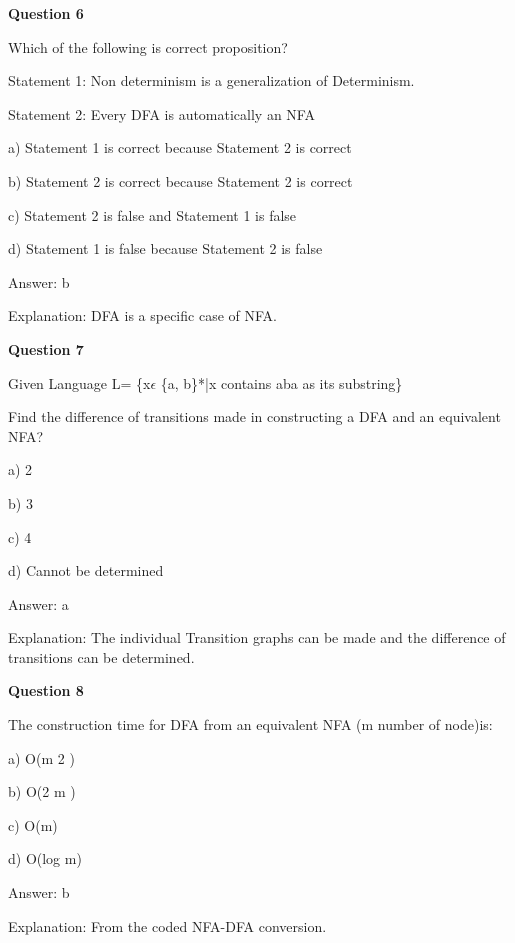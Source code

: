 \documentclass{article}
\begin{document}
\begin{mdframed}[linewidth=1pt, roundcorner=5pt, linecolor=gray!30, backgroundcolor=gray!5]
\textbf{Question 6} 

Which of the following is correct proposition?

Statement 1: Non determinism is a generalization of Determinism.

Statement 2: Every DFA is automatically an NFA

a) Statement 1 is correct because Statement 2 is correct

b) Statement 2 is correct because Statement 2 is correct

c) Statement 2 is false and Statement 1 is false

d) Statement 1 is false because Statement 2 is false
\vspace{5pt} \par
\begin{tcolorbox}[colback=green!5, colframe=green!40!black, title=Solution]
Answer: b

Explanation: DFA is a specific case of NFA.
\end{tcolorbox}
\end{mdframed}
\newpage

\begin{mdframed}[linewidth=1pt, roundcorner=5pt, linecolor=gray!30, backgroundcolor=gray!5]
\textbf{Question 7} 

Given Language L= \{x$\epsilon$ \{a, b\}*|x contains aba as its substring\}

Find the difference of transitions made in constructing a DFA and an equivalent NFA?

a) 2

b) 3

c) 4

d) Cannot be determined
\vspace{5pt} \par
\begin{tcolorbox}[colback=green!5, colframe=green!40!black, title=Solution]
Answer: a

Explanation: The individual Transition graphs can be made and the difference of transitions can be determined.
\end{tcolorbox}
\end{mdframed}

\begin{mdframed}[linewidth=1pt, roundcorner=5pt, linecolor=gray!30, backgroundcolor=gray!5]
\textbf{Question 8} 

The construction time for DFA from an equivalent NFA (m number of node)is:

a) O(m
2
)

b) O(2
m
)

c) O(m)

d) O(log m)
\vspace{5pt} \par
\begin{tcolorbox}[colback=green!5, colframe=green!40!black, title=Solution]
Answer: b

Explanation: From the coded NFA-DFA conversion.
\end{tcolorbox}
\end{mdframed}
\end{document}
